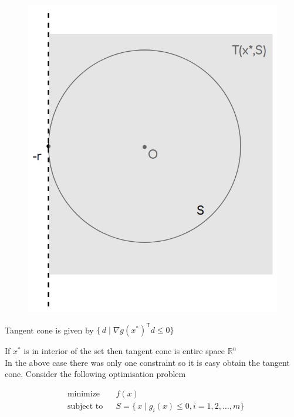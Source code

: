 \documentclass[twoside]{article}
\DeclareMathOperator{\minimize}{minimize}
\DeclareMathOperator{\subjectto}{subject\ to}
\begin{document}
\begin{figure}[h]
\center
\includegraphics[scale=0.35]{images/pic4.png}
\end{figure}

Tangent cone is given by 
$ \{\,d\mid \nabla g(x^*)^\mathsf{T}d\leq 0 \}$

If $x^{*}$ is in interior of the set then tangent cone is entire space $\mathbb{R}^n$\\

In the above case there was only one constraint so it is easy obtain the tangent cone. Consider the following optimisation problem 

\begin{equation}
\begin{aligned}
& \minimize && f(x)\\
& \subjectto && S = \{\,x\mid g_{i}(x)\leq 0 , i = 1,2, \ldots, m\}
\end{aligned}
\end{equation}
\end{document}
